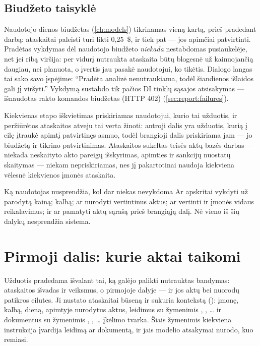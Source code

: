 \subsection{Biudžeto taisyklė}

Naudotojo dienos biudžetas (\cref{ch:models}) tikrinamas vieną kartą, prieš pradedant darbą:
ataskaitai paleisti turi likti 0,25~\$, ir tiek pat --- jos apimčiai patvirtinti. Pradėtas
vykdymas dėl naudotojo biudžeto \emph{niekada} nestabdomas pusiaukelėje, net jei ribą viršija:
per vidurį nutraukta ataskaita būtų blogesnė už kainuojančią daugiau, nei planuota, o įvertis
jau pasakė naudotojui, ko tikėtis. Dialogo langas tai sako savo įspėjime: \enquote{Pradėta
analizė nenutraukiama, todėl šiandienos išlaidos gali jį viršyti.} Vykdymą sustabdo tik pačios
DI tinklų sąsajos atsisakymas --- išnaudotas rakto komandos biudžetas (HTTP 402)
(\cref{sec:report:failures}).

Kiekvienas etapo iškvietimas priskiriamas naudotojui, kurio tai užduotis, ir peržiūrėtos
ataskaitos atveju tai verta žinoti: antroji dalis yra užduotis, kurią į eilę įtraukė apimtį
patvirtinęs asmuo, todėl brangioji dalis priskiriama jam --- jo biudžetą ir tikrino
patvirtinimas. Ataskaitos sukeltas teisės aktų bazės darbas --- niekada neskaityto akto pareigų
išskyrimas, apimties ir sankcijų nuostatų skaitymas --- niekam nepriskiriamas, nes jį
pakartotinai naudoja kiekviena vėlesnė kiekvienos įmonės ataskaita.

\begin{humanbox}{Ką naudotojas nusprendžia, kol dar niekas nevykdoma}
Ar apskritai vykdyti už parodytą kainą; kalbą; ar nurodyti vertintinus aktus; ar vertinti ir
įmonės vidaus reikalavimus; ir ar pamatyti aktų sąrašą prieš brangiąją dalį. Nė vieno iš šių
dalykų nesprendžia sistema.
\end{humanbox}


\section{Pirmoji dalis: kurie aktai taikomi}\label{sec:report:first}

Užduotis pradedama išvalant tai, ką galėjo palikti nutrauktas bandymas: ataskaitos išvadas ir
veiksmus, o pirmojoje dalyje --- ir jos aktų bei nuorodų patikros eilutes. Ji nustato
ataskaitai būseną  ir sukuria kontekstą (): įmonę, kalbą, dieną,
apimtyje nurodytus aktus, leidimus su žymenimis , , \ldots{} ir dokumentus su
žymenimis , , \ldots{} įkėlimo tvarka. Šiais žymenimis kiekviena instrukcija
įvardija leidimą ar dokumentą, ir jais modelio atsakymai nurodo, kuo remiasi.

